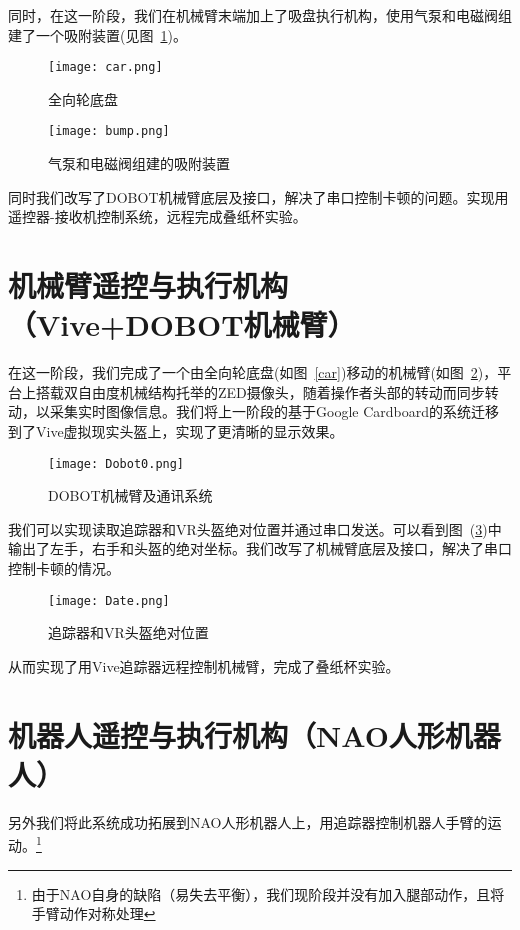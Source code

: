 同时，在这一阶段，我们在机械臂末端加上了吸盘执行机构，使用气泵和电磁阀组建了一个吸附装置(见图~\ref{bump})。

\begin{figure}
\begin{minipage}{0.48\textwidth}
  \centering
  \texttt{[image: car.png]}
  \caption{全向轮底盘}
  \label{car}
\end{minipage}\hfill
\begin{minipage}{0.48\textwidth}
  \centering
  \texttt{[image: bump.png]}
  \caption{气泵和电磁阀组建的吸附装置}
  \label{bump}
\end{minipage}
\end{figure}


同时我们改写了DOBOT机械臂底层及接口，解决了串口控制卡顿的问题。实现用遥控器-接收机控制系统，远程完成叠纸杯实验。

\section{机械臂遥控与执行机构（Vive+DOBOT机械臂）}

在这一阶段，我们完成了一个由全向轮底盘(如图~\ref{car})移动的机械臂(如图~\ref{sys})，平台上搭载双自由度机械结构托举的ZED摄像头，随着操作者头部的转动而同步转动，以采集实时图像信息。我们将上一阶段的基于Google Cardboard的系统迁移到了Vive虚拟现实头盔上，实现了更清晰的显示效果。


\begin{figure}[htbp]
\small
\centering
\texttt{[image: Dobot0.png]}
\caption{DOBOT机械臂及通讯系统} 
\label{sys}
\end{figure}


我们可以实现读取追踪器和VR头盔绝对位置并通过串口发送。可以看到图~(\ref{POS})中输出了左手，右手和头盔的绝对坐标。我们改写了机械臂底层及接口，解决了串口控制卡顿的情况。
\begin{figure}[htbp]
\small
\centering
\texttt{[image: Date.png]}
\caption{追踪器和VR头盔绝对位置} 
\label{POS}
\end{figure}

从而实现了用Vive追踪器远程控制机械臂，完成了叠纸杯实验。

\section{机器人遥控与执行机构（NAO人形机器人）}
另外我们将此系统成功拓展到NAO人形机器人上，用追踪器控制机器人手臂的运动。\footnote{由于NAO自身的缺陷（易失去平衡），我们现阶段并没有加入腿部动作，且将手臂动作对称处理}

